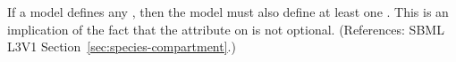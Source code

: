 If a model defines any \Species, then the model must also define at least
one \Compartment.  This is an implication of the fact that the
 attribute on \Species is not optional.  (References: SBML
L3V1 Section~\ref{sec:species-compartment}.)
